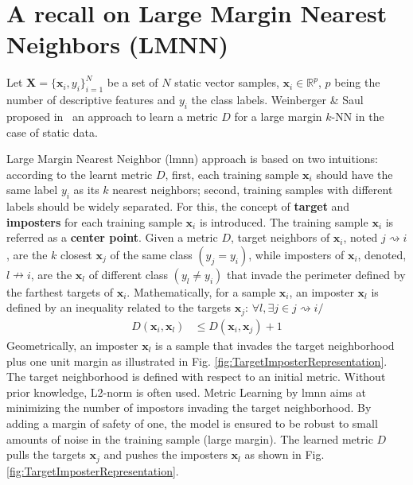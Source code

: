 \section{A recall on Large Margin Nearest Neighbors (LMNN)}
\label{LMNN}
Let $\textbf{X}=\{\textbf{x}_i,y_i\}_{i=1}^N$ be a set of $N$ static vector samples, ${\textbf{x}_i \in \mathbb{R}^{p}}$, $p$ being the number of descriptive features and $y_i$ the class labels. Weinberger \& Saul proposed in~\cite{Weinberger2009} an approach to learn a metric $D$ for a large margin $k$-NN in the case of static data. 

Large Margin Nearest Neighbor ({\sc lmnn}) approach is based on two intuitions: according to the learnt metric $D$, first, each training sample $\textbf{x}_i$ should have the same label $y_i$ as its $k$ nearest neighbors; second, training samples with different labels should be widely separated. For this, the concept of \textbf{target} and \textbf{imposters} for each training sample $\textbf{x}_i$ is introduced. The training sample $\textbf{x}_i$ is referred as a \textbf{center point}. Given a metric $D$, target neighbors of $\textbf{x}_i$, noted $j \rightsquigarrow i$, are the $k$ closest $\textbf{x}_j$ of the same class $(y_j=y_i)$, while imposters of $\textbf{x}_i$, denoted, $l \nrightarrow i$, are the $\textbf{x}_l$ of different class $(y_l \neq y_i)$ that invade the perimeter defined by the farthest targets of $\textbf{x}_i$. 
Mathematically, for a sample $\textbf{x}_i$, an imposter $\textbf{x}_l$ is defined by an inequality related to the targets $\textbf{x}_j$: $\forall l, \exists j \in j \rightsquigarrow i /$
\begin{align}
	D(\textbf{x}_i,\textbf{x}_l) &\leq D(\textbf{x}_i,\textbf{x}_j) + 1
\end{align}
Geometrically, an imposter $\textbf{x}_{l}$ is a sample that invades the target neighborhood plus one unit margin as illustrated in Fig. \ref{fig:TargetImposterRepresentation}. The target neighborhood is defined with respect to an initial metric. Without prior knowledge, L2-norm is often used. Metric Learning by {\sc lmnn} aims at minimizing the number of impostors invading the target neighborhood. By adding a margin of safety of one, the model is ensured to be robust to small amounts of noise in the training sample (large margin). The learned metric $D$ pulls the targets $\textbf{x}_j$ and pushes the imposters $\textbf{x}_{l}$ as shown in Fig. \ref{fig:TargetImposterRepresentation}.

